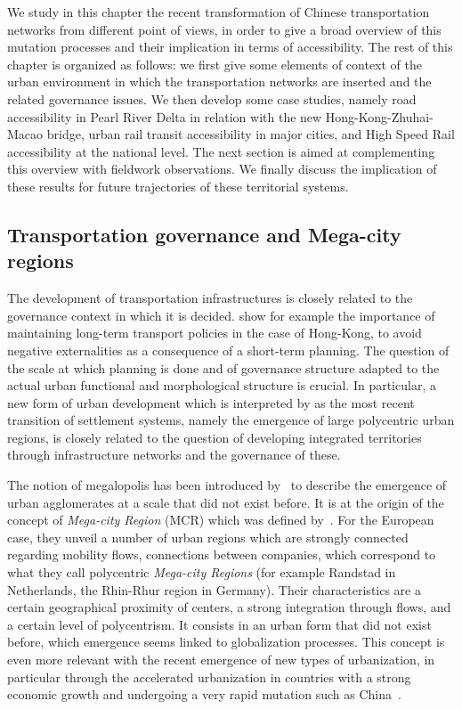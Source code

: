 \documentclass[11pt]{article}
\begin{document}
We study in this chapter the recent transformation of Chinese transportation networks from different point of views, in order to give a broad overview of this mutation processes and their implication in terms of accessibility. The rest of this chapter is organized as follows: we first give some elements of context of the urban environment in which the transportation networks are inserted and the related governance issues. We then develop some case studies, namely road accessibility in Pearl River Delta in relation with the new Hong-Kong-Zhuhai-Macao bridge, urban rail transit accessibility in major cities, and High Speed Rail accessibility at the national level. The next section is aimed at complementing this overview with fieldwork observations. We finally discuss the implication of these results for future trajectories of these territorial systems.





\subsection{Transportation governance and Mega-city regions}


The development of transportation infrastructures is closely related to the governance context in which it is decided. \cite{tang2008impact} show for example the importance of maintaining long-term transport policies in the case of Hong-Kong, to avoid negative externalities as a consequence of a short-term planning. The question of the scale at which planning is done and of governance structure adapted to the actual urban functional and morphological structure is crucial. In particular, a new form of urban development which is interpreted by \cite{lenechet2017peupler} as the most recent transition of settlement systems, namely the emergence of large polycentric urban regions, is closely related to the question of developing integrated territories through infrastructure networks and the governance of these.


The notion of megalopolis has been introduced by~\cite{gottmann1961megalopolis} to describe the emergence of urban agglomerates at a scale that did not exist before. It is at the origin of the concept of \emph{Mega-city Region} (MCR) which was defined by~\cite{hall2006polycentric}. For the European case, they unveil a number of urban regions which are strongly connected regarding mobility flows, connections between companies, which correspond to what they call polycentric \emph{Mega-city Regions} (for example Randstad in Netherlands, the Rhin-Rhur region in Germany). Their characteristics are a certain geographical proximity of centers, a strong integration through flows, and a certain level of polycentrism. It consists in an urban form that did not exist before, which emergence seems linked to globalization processes. This concept is even more relevant with the recent emergence of new types of urbanization, in particular through the accelerated urbanization in countries with a strong economic growth and undergoing a very rapid mutation such as China~\citep{swerts2015megacities}.
\end{document}
